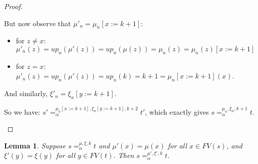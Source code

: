 \documentclass{lmcs}
\theoremstyle{theorem}\newtheorem{theorem}{Theorem}
\theoremstyle{theorem}\newtheorem{lemma}[theorem]{Lemma}
\theoremstyle{theorem}\newtheorem{corollary}[theorem]{Corollary}
\theoremstyle{definition}\newtheorem{definition}[theorem]{Definition}
\theoremstyle{definition}\newtheorem{example}[theorem]{Example}
\newcommand{\FV}{\mathit{FV}}
\begin{document}
\begin{proof}
\begin{itemize}
  But now observe that $\mu'_n = \mu_n[x:=k+1]$:
  \begin{itemize}
  \item for $z \neq x$: $\mu'_n(z) = \mathit{up}_n(\mu'(z)) =
    \mathit{up}_n(\mu(z)) = \mu_n(z) = \mu_n(z)[x:=k+1]$
  \item for $z = x$: $\mu'_n(z) = \mathit{up}_n(\mu'(z)) = \mathit{up}_n(k) =
    k+1 = \mu_n[x:=k+1](x)$. \\
  \end{itemize}
  And similarly, $\xi'_n = \xi_n[y:=k+1]$.

  So we have: $s' =_\alpha^{\mu_n[x:=k+1],\xi_n[y:=k+1],k+2} t'$, which
  exactly gives $s =_\alpha^{\mu_n,\xi_n,k+1} t$.
  \qedhere
\end{itemize}
\end{proof}

\begin{lemma}\label{lem:alphaunusedvar}
Suppose $s =_\alpha^{\mu,\xi,k} t$ and $\mu'(x) = \mu(x)$ for all $x \in \FV(s)$, and $\xi'(y) = \xi(y)$ for all $y \in \FV(t)$.
Then $s =_\alpha^{\mu',\xi',k} t$.
\end{lemma}
\end{document}
